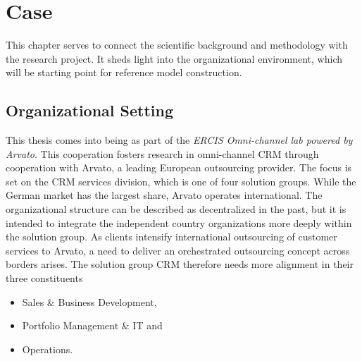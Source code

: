 \chapter{Case}
This chapter serves to connect the scientific background and methodology with the research project. 
It sheds light into the organizational environment, which will be starting point for reference model construction.  

\section{Organizational Setting}
This thesis comes into being as part of the \textit{ERCIS Omni-channel lab powered by Arvato}. This cooperation fosters research in omni-channel CRM through cooperation with Arvato, a leading European outsourcing provider. The focus is set on the CRM services division, which is one of four 
solution groups. While the German market has the largest share, Arvato operates international. The organizational structure can be described as decentralized in the past, but it is intended to integrate the independent country organizations more deeply within the solution group. As clients intensify international outsourcing of customer services to Arvato, a need to deliver an orchestrated outsourcing concept across borders arises. The solution group CRM therefore needs more alignment in their three constituents

\begin{itemize}
	\item Sales \& Business Development,
	\item Portfolio Management \& IT and
	\item Operations.
\end{itemize}

